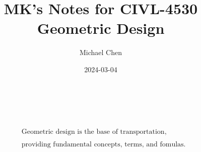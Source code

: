 \documentclass{article}
\title{MK's Notes for CIVL-4530 Geometric Design}
\date{2024-03-04}
\author{Michael Chen}
\begin{document}
  \maketitle

  \begin{align*}
  \\
  \\
  \\
  \\
  \\
  \\
  \\
  \\
  & \text{Geometric design is the base of transportation,}\\ 
  \\
  & \text{providing fundamental concepts, terms, and fomulas.}\\
  \end{align*}
  \newpage

  \tableofcontents
  \newpage


  
  \newpage
  
  \newpage
  
  \newpage
  
  \newpage



\end{document}
